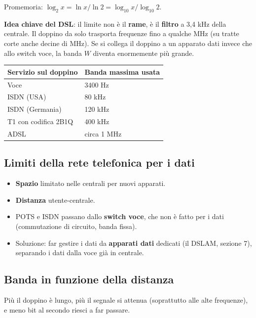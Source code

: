 Promemoria: \(\log_2 x = \ln x / \ln 2 = \log_{10} x / \log_{10} 2\).

\textbf{Idea chiave del DSL}: il limite non è il \textbf{rame}, è il \textbf{filtro} a 3,4 kHz della centrale. Il doppino da solo trasporta frequenze fino a qualche MHz (su tratte corte anche decine di MHz). Se si collega il doppino a un apparato dati invece che allo switch voce, la banda \(W\) diventa enormemente più grande.

\begin{longtable}[]{@{}ll@{}}
\toprule\noalign{}
Servizio sul doppino & Banda massima usata \\
\midrule\noalign{}
\endhead
\bottomrule\noalign{}
\endlastfoot
Voce & 3400 Hz \\
ISDN (USA) & 80 kHz \\
ISDN (Germania) & 120 kHz \\
T1 con codifica 2B1Q & 400 kHz \\
ADSL & circa 1 MHz \\
\end{longtable}

\subsection{Limiti della rete telefonica per i dati}

\begin{itemize}
\tightlist
\item
  \textbf{Spazio} limitato nelle centrali per nuovi apparati.
\item
  \textbf{Distanza} utente-centrale.
\item
  POTS e ISDN passano dallo \textbf{switch voce}, che non è fatto per i dati (commutazione di circuito, banda fissa).
\item
  Soluzione: far gestire i dati da \textbf{apparati dati} dedicati (il DSLAM, sezione 7), separando i dati dalla voce già in centrale.
\end{itemize}

\subsection{Banda in funzione della distanza}

\begin{inbreve}

Più il doppino è lungo, più il segnale si attenua (soprattutto alle alte frequenze), e meno bit al secondo riesci a far passare.

\end{inbreve}

